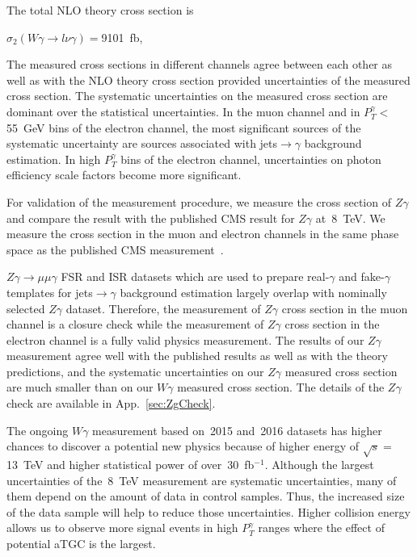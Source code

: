 The total NLO theory cross section is 

\begin{center}
$\sigma_2(W\gamma\rightarrow l\nu\gamma)=$9101~fb,
\end{center}


The measured cross sections in different channels agree between each other as well as with the NLO theory cross section provided uncertainties of the measured cross section. The systematic uncertainties on the measured cross section are dominant over the statistical uncertainties. In the muon channel and in $P_T^{\gamma}<$55~GeV bins of the electron channel, the most significant sources of the systematic uncertainty are sources associated with jets$\rightarrow\gamma$ background estimation. In high $P_T^{\gamma}$ bins of the electron channel, uncertainties on photon efficiency scale factors become more significant.

For validation of the measurement procedure, we measure the cross section of $Z\gamma$ and compare the result with the published CMS result for $Z\gamma$ at~8~TeV. We measure the cross section in the muon and electron channels in the same phase space as the published CMS measurement~\cite{ref_Zg8TeV}. 

$Z\gamma\rightarrow\mu\mu\gamma$ FSR and ISR datasets which are used to prepare real-$\gamma$ and fake-$\gamma$ templates for jets$\rightarrow\gamma$ background estimation largely overlap with nominally selected $Z\gamma$ dataset. Therefore, the measurement of $Z\gamma$ cross section in the muon channel is a closure check while the measurement of $Z\gamma$ cross section in the electron channel is a fully valid physics measurement. The results of our $Z\gamma$ measurement agree well with the published results as well as with the theory predictions, and the systematic uncertainties on our $Z\gamma$ measured cross section are much smaller than on our $W\gamma$ measured cross section. The details of the $Z\gamma$ check are available in App.~\ref{sec:ZgCheck}.

The ongoing $W\gamma$ measurement based on~2015 and~2016 datasets has higher chances to discover a potential new physics because of higher energy of $\sqrt{s}=$13~TeV and higher statistical power of over~30~fb$^{-1}$. Although the largest uncertainties of the~8~TeV measurement are systematic uncertainties, many of them depend on the amount of data in control samples. Thus, the increased size of the data sample will help to reduce those uncertainties. Higher collision energy allows us to observe more signal events in high $P_T^{\gamma}$ ranges where the effect of potential aTGC is the largest. 

